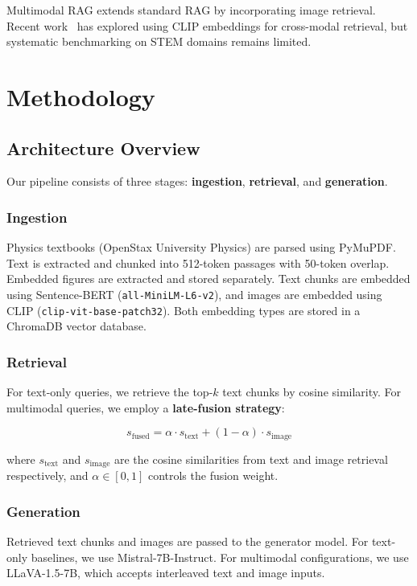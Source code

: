 \documentclass[conference]{IEEEtran}
\begin{document}
Multimodal RAG extends standard RAG by incorporating image retrieval.
Recent work~\cite{chen2024mrag} has explored using CLIP embeddings for cross-modal retrieval, but systematic benchmarking on STEM domains remains limited.

\section{Methodology}
\label{sec:method}

\subsection{Architecture Overview}

Our pipeline consists of three stages: \textbf{ingestion}, \textbf{retrieval}, and \textbf{generation}.

\subsubsection{Ingestion}
Physics textbooks (OpenStax University Physics) are parsed using PyMuPDF.
Text is extracted and chunked into 512-token passages with 50-token overlap.
Embedded figures are extracted and stored separately.
Text chunks are embedded using Sentence-BERT (\texttt{all-MiniLM-L6-v2}), and images are embedded using CLIP (\texttt{clip-vit-base-patch32}).
Both embedding types are stored in a ChromaDB vector database.

\subsubsection{Retrieval}
For text-only queries, we retrieve the top-$k$ text chunks by cosine similarity.
For multimodal queries, we employ a \textbf{late-fusion strategy}:

\begin{equation}
    s_{\text{fused}} = \alpha \cdot s_{\text{text}} + (1 - \alpha) \cdot s_{\text{image}}
    \label{eq:fusion}
\end{equation}

where $s_{\text{text}}$ and $s_{\text{image}}$ are the cosine similarities from text and image retrieval respectively, and $\alpha \in [0, 1]$ controls the fusion weight.

\subsubsection{Generation}
Retrieved text chunks and images are passed to the generator model.
For text-only baselines, we use Mistral-7B-Instruct.
For multimodal configurations, we use LLaVA-1.5-7B, which accepts interleaved text and image inputs.
\end{document}
